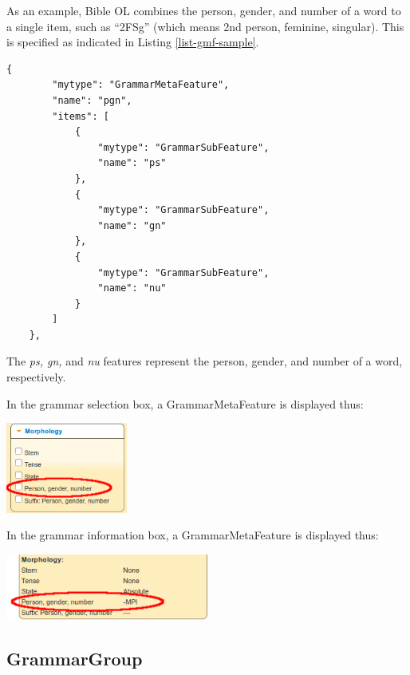 \documentclass[11pt,oneside,a4paper]{memoir}
\begin{document}
As an example, Bible OL combines the person, gender, and number of a word to a single item, such as
``2FSg'' (which means 2nd person, feminine, singular). This is specified as indicated in Listing
\ref{list-gmf-sample}.

\begin{lstlisting}[caption={A GrammarMetaFeature combining person, gender, and number},label=list-gmf-sample]
    {
        "mytype": "GrammarMetaFeature",
        "name": "pgn",
        "items": [
            {
                "mytype": "GrammarSubFeature",
                "name": "ps"
            },
            {
                "mytype": "GrammarSubFeature",
                "name": "gn"
            },
            {
                "mytype": "GrammarSubFeature",
                "name": "nu"
            }
        ]
    },
\end{lstlisting}

The \emph{ps, gn,} and \emph{nu} features represent the person, gender, and number of a word,
respectively.


\Needspace*{5cm}%
In the grammar selection box, a GrammarMetaFeature is displayed thus:

\begin{center}
  \includegraphics[width=0.3\textwidth]{pgn1.png}
\end{center}

\Needspace*{5cm}%
In the grammar information box, a GrammarMetaFeature is displayed thus:

\begin{center}
  \includegraphics[width=0.5\textwidth]{pgn2.png}
\end{center}


\subsection{GrammarGroup}\label{sec-grammargroup}
\end{document}
